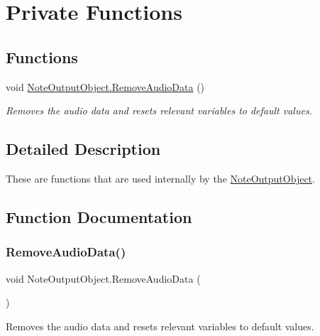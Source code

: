 \hypertarget{group___n_o_o_priv_func}{}\section{Private Functions}
\label{group___n_o_o_priv_func}
\subsection*{Functions}
\begin{DoxyCompactItemize}
\item 
void \hyperlink{group___n_o_o_priv_func_ga12f593bb5de83dc548eff4617fc687b5}{Note\+Output\+Object.\+Remove\+Audio\+Data} ()
\begin{DoxyCompactList}\small\item\em Removes the audio data and resets relevant variables to default values. \end{DoxyCompactList}\end{DoxyCompactItemize}


\subsection{Detailed Description}
These are functions that are used internally by the \hyperlink{class_note_output_object}{Note\+Output\+Object}. 

\subsection{Function Documentation}
\mbox{\label{group___n_o_o_priv_func_ga12f593bb5de83dc548eff4617fc687b5}} 
\subsubsection{\texorpdfstring{Remove\+Audio\+Data()}{RemoveAudioData()}}
{\footnotesize\ttfamily void Note\+Output\+Object.\+Remove\+Audio\+Data (\begin{DoxyParamCaption}{ }\end{DoxyParamCaption})\hspace{0.3cm}{\ttfamily [private]}}



Removes the audio data and resets relevant variables to default values. 



